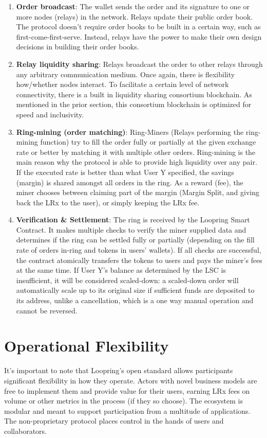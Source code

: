 \documentclass[UTF8,nofonts]{article}
\begin{document}
\begin{multicols}{2}
\begin{enumerate}
\item \textbf{Order broadcast}: The wallet sends the order and its signature to one or more nodes (relays) in the network. Relays update their public order book. The protocol doesn't require order books to be built in a certain way, such as first-come-first-serve. Instead, relays have the power to make their own design decisions in building their order books.

\item \textbf{Relay liquidity sharing}: Relays broadcast the order to other relays through any arbitrary communication medium. Once again, there is flexibility how/whether nodes interact. To facilitate a certain level of network connectivity, there is a built in liquidity sharing consortium blockchain. As mentioned in the prior section, this consortium blockchain is optimized for speed and inclusivity.

\item \textbf{Ring-mining (order matching)}: Ring-Miners (Relays performing the ring-mining function) try to fill the order fully or partially at the given exchange rate or better by matching it with multiple other orders. Ring-mining is the main reason why the protocol is able to provide high liquidity over any pair. If the executed rate is better than what User Y specified, the savings (margin) is shared amongst all orders in the ring. As a reward (fee), the miner chooses between claiming part of the margin (Margin Split, and giving back the LRx to the user), or simply keeping the LRx fee.

\item \textbf{Verification \& Settlement}: The ring is received by the Loopring Smart Contract. It makes multiple checks to verify the miner supplied data and determines if the ring can be settled fully or partially (depending on the fill rate of orders in-ring and tokens in users' wallets). If all checks are successful, the contract atomically transfers the tokens to users and pays the miner's fees at the same time. If User Y's balance as determined by the LSC is insufficient, it will be considered scaled-down: a scaled-down order will automatically scale up to its original size if sufficient funds are deposited to its address, unlike a cancellation, which is a one way manual operation and cannot be reversed.

\end{enumerate}

\section{Operational Flexibility\label{sec:business_model}}
It's important to note that Loopring's open standard allows participants significant flexibility in how they operate. Actors with novel business models are free to implement them and provide value for their users, earning LRx fees on volume or other metrics in the process (if they so choose). The ecosystem is modular and meant to support participation from a multitude of applications. The non-proprietary protocol places control in the hands of users and collaborators.


\end{multicols}
\end{document}
